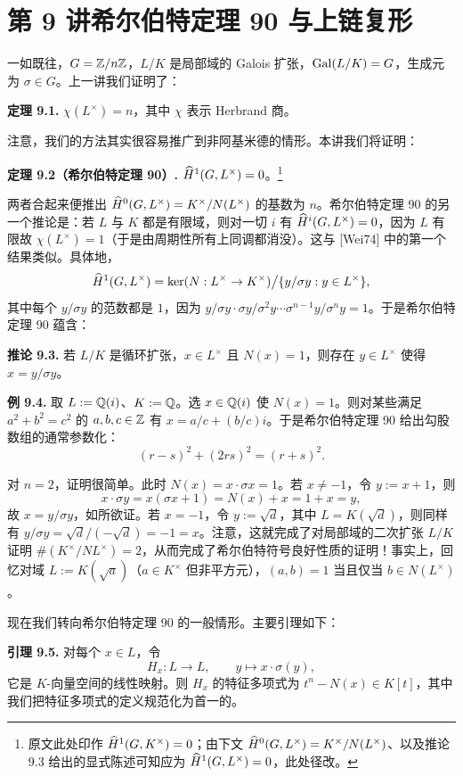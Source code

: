 \section*{第 9 讲\quad 希尔伯特定理 90 与上链复形}

一如既往，$G=\mathbb{Z}/n\mathbb{Z}$，$L/K$ 是局部域的 Galois 扩张，$\operatorname{Gal}(L/K)=G$，生成元为 $\sigma\in G$。上一讲我们证明了：

\textbf{定理 9.1.} $\chi(L^\times)=n$，其中 $\chi$ 表示 Herbrand 商。

注意，我们的方法其实很容易推广到非阿基米德的情形。本讲我们将证明：

\textbf{定理 9.2（希尔伯特定理 90）.} $\widehat{H}^1(G,L^\times)=0$。\footnote{原文此处印作 $\widehat{H}^1(G,K^\times)=0$；由下文 $\widehat{H}^0(G,L^\times)=K^\times/N(L^\times)$、以及推论 9.3 给出的显式陈述可知应为 $\widehat{H}^1(G,L^\times)=0$，此处径改。}

两者合起来便推出 $\widehat{H}^0(G,L^\times)=K^\times/N(L^\times)$ 的基数为 $n$。希尔伯特定理 90 的另一个推论是：若 $L$ 与 $K$ 都是有限域，则对一切 $i$ 有 $\widehat{H}^i(G,L^\times)=0$，因为 $L$ 有限故 $\chi(L^\times)=1$（于是由周期性所有上同调都消没）。这与 [Wei74] 中的第一个结果类似。具体地，
\[
\widehat{H}^1(G,L^\times)=\ker(N:L^\times\to K^\times)\big/\{y/\sigma y:y\in L^\times\},
\]
其中每个 $y/\sigma y$ 的范数都是 $1$，因为 $y/\sigma y\cdot\sigma y/\sigma^2y\cdots\sigma^{n-1}y/\sigma^ny=1$。于是希尔伯特定理 90 蕴含：

\textbf{推论 9.3.} 若 $L/K$ 是循环扩张，$x\in L^\times$ 且 $N(x)=1$，则存在 $y\in L^\times$ 使得 $x=y/\sigma y$。

\textbf{例 9.4.} 取 $L:=\mathbb{Q}(i)$、$K:=\mathbb{Q}$。选 $x\in\mathbb{Q}(i)$ 使 $N(x)=1$。则对某些满足 $a^2+b^2=c^2$ 的 $a,b,c\in\mathbb{Z}$ 有 $x=a/c+(b/c)i$。于是希尔伯特定理 90 给出勾股数组的通常参数化：
\[
(r-s)^2+(2rs)^2=(r+s)^2 .
\]

对 $n=2$，证明很简单。此时 $N(x)=x\cdot\sigma x=1$。若 $x\neq-1$，令 $y:=x+1$，则
\[
x\cdot\sigma y=x(\sigma x+1)=N(x)+x=1+x=y,
\]
故 $x=y/\sigma y$，如所欲证。若 $x=-1$，令 $y:=\sqrt d$，其中 $L=K(\sqrt d)$，则同样有 $y/\sigma y=\sqrt d/(-\sqrt d)=-1=x$。注意，这就完成了对局部域的二次扩张 $L/K$ 证明 $\#(K^\times/NL^\times)=2$，从而完成了希尔伯特符号良好性质的证明！事实上，回忆对域 $L:=K(\sqrt a)$（$a\in K^\times$ 但非平方元），$(a,b)=1$ 当且仅当 $b\in N(L^\times)$。

现在我们转向希尔伯特定理 90 的一般情形。主要引理如下：

\textbf{引理 9.5.} 对每个 $x\in L$，令
\[
H_x:L\to L,\qquad y\mapsto x\cdot\sigma(y),
\]
它是 $K$-向量空间的线性映射。则 $H_x$ 的特征多项式为 $t^n-N(x)\in K[t]$，其中我们把特征多项式的定义规范化为首一的。

